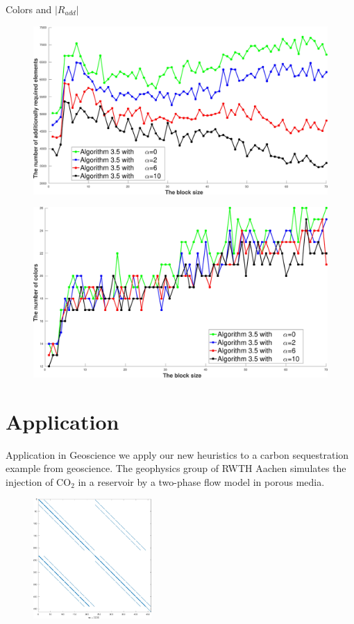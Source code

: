\documentclass{beamer}
\begin{document}
\begin{frame}{Colors and $|R_{add}|$}
\begin{figure}
\centering
\includegraphics[width=0.5\linewidth]{ex33_alg35_alpha_0_2_6_10_bls_lfo_adds}
\end{figure}

\begin{figure}
\centering
\includegraphics[width=0.5\linewidth]{ex33_alg35_alpha_0_2_6_10_bls_lfo_cols}
\end{figure}
\end{frame}

\section{Application}
\begin{frame}{Application in Geoscience}
we apply our new heuristics to a carbon sequestration example from geoscience.
The geophysics group of RWTH Aachen simulates the injection of CO$_2$ in a reservoir by a
two-phase flow model in porous media.
\begin{figure}
\centering
\includegraphics[width=0.4\textwidth]{co2_jac}
\end{figure}
\end{frame}
\end{document}
